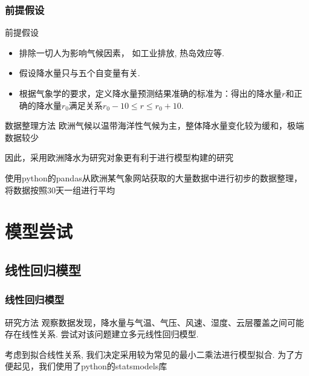 \documentclass[10pt]{beamer}
\begin{document}
\begin{frame}
	\frametitle{前提假设}
	\begin{block}{前提假设}
		\begin{itemize}
			\item 排除一切人为影响气候因素， 如工业排放, 热岛效应等.
			\item 假设降水量只与五个自变量有关.
			\item 根据气象学的要求，定义降水量预测结果准确的标准为：得出的降水量$r$和正确的降水量$r_0$满足关系$r_0 - 10 \le r \le r_0 + 10$.
		\end{itemize}
	\end{block}
	\begin{block}{数据整理方法}
		欧洲气候以温带海洋性气候为主，整体降水量变化较为缓和，极端数据较少

		因此，采用欧洲降水为研究对象更有利于进行模型构建的研究

		使用python的pandas从欧洲某气象网站获取的大量数据中进行初步的数据整理，将数据按照$30$天一组进行平均
	\end{block}
\end{frame}

\section{模型尝试}
\subsection{线性回归模型}
\begin{frame}
	\frametitle{线性回归模型}

	\begin{block}{研究方法}
		观察数据发现，降水量与气温、气压、风速、湿度、云层覆盖之间可能存在线性关系.
		尝试对该问题建立多元线性回归模型.

		考虑到拟合线性关系, 我们决定采用较为常见的最小二乘法进行模型拟合.
		为了方便起见，我们使用了python的statsmodels库
	\end{block}
\end{frame}
\end{document}
